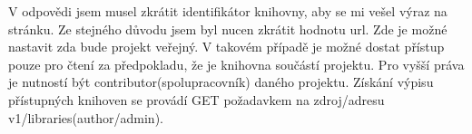 \par V odpovědi jsem musel zkrátit identifikátor knihovny, aby se mi vešel výraz na stránku. Ze stejného důvodu jsem byl nucen zkrátit hodnotu url. Zde je možné nastavit zda bude projekt veřejný. V takovém případě je možné dostat přístup pouze pro čtení za předpokladu, že je knihovna součástí projektu. Pro vyšší práva je nutností být contributor(spolupracovník) daného projektu. Získání výpisu přístupných knihoven se provádí GET požadavkem na zdroj/adresu v1/libraries(author/admin).